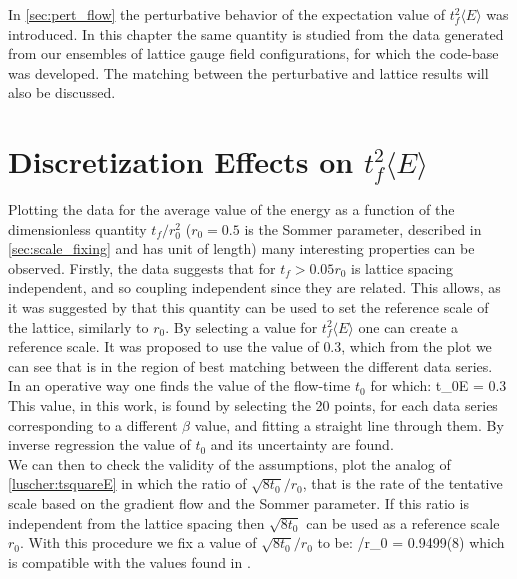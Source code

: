 In \cref{sec:pert_flow} the perturbative behavior of the expectation value of $t_f^2\langle E \rangle$ was introduced. In this chapter the same quantity is studied from the data generated from our ensembles of lattice gauge field configurations, for which the code-base was developed. The matching between the perturbative and lattice results will also be discussed.

\section{Discretization Effects on $t_f^2\langle E \rangle$}
\label{sec:scale}
Plotting the data for the average value of the energy as a function of the dimensionless quantity $t_f/r_0^2$ ($r_0=0.5$ is the Sommer parameter, described in \cref{sec:scale_fixing} and has unit of length) many interesting properties can be observed.
Firstly, the data suggests that for $t_f > 0.05r_0$ is lattice spacing independent, and so coupling independent since they are related. This allows, as it was suggested by \cite{luscher_properties_2010} that this quantity can be used to set the reference scale of the lattice, similarly to $r_0$. By selecting a value for $t_f^2\langle E \rangle$ one can create a reference scale. It was proposed to use the value of $0.3$, which from the plot we can see that is in the region of best matching between the different data series.\\
In an operative way one finds the value of the flow-time $t_0$ for which:
\beq
    t_0\langle E \rangle = 0.3
\eeq
This value, in this work, is found by selecting the 20 points, for each data series corresponding to a different $\beta$ value, and fitting a straight line through them. By inverse regression the value of $t_0$ and its uncertainty are found.\\
We can then to check the validity of the assumptions, plot the analog of \cref{luscher:tsquareE} in which the ratio of $\sqrt{8t_0}/r_0$, that is the rate of the tentative scale based on the gradient flow and the Sommer parameter. If this ratio is independent from the lattice spacing then $\sqrt{8t_0}$ can be used as a reference scale $r_0$.
With this procedure we fix a value of $\sqrt{8t_0}/r_0$ to be:
\beq
{}/r_0 = 0.9499(8)
\eeq 
which is compatible with the values found in \CIT.


